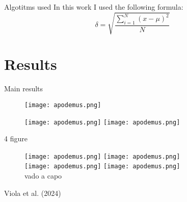 \documentclass{beamer}
\begin{document}
\begin{frame}{Algotitms used} %
In this work I used the following formula:
\bigskip
\begin{equation}
    \delta = \sqrt{\frac{\displaystyle\sum_{i=1}^{N}{(x - \mu)^2}}{N}}
\end{equation}
    
\end{frame}

\section{Results} 

\begin{frame}{Main results}

\begin{figure} 
    \centering %
    \texttt{[image: apodemus.png]} %
\end{figure}


\begin{figure} 
    \centering 
    \texttt{[image: apodemus.png]} %
    \pause \texttt{[image: apodemus.png]} 
\end{figure} 
\end{frame}

\begin{frame}{4 figure}
\begin{figure} %
    \centering %
    \texttt{[image: apodemus.png]} 
    \texttt{[image: apodemus.png]} \\ %
    \texttt{[image: apodemus.png]} 
    \texttt{[image: apodemus.png]} \\ vado a capo
\end{figure}

\bigskip %
\centering %
\scriptsize{Viola et al. (2024)} %
\end{frame}
\end{document}
